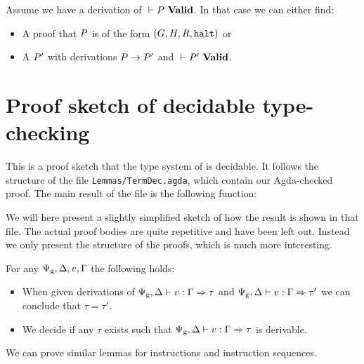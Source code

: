 \begin{theorem}
  Assume we have a derivation of ${} |- {P}\ \mathbf{Valid}$. In that case we can either
  find:
  \begin{itemize}
  \item A proof that $P$ is of the form
    $(G, H, R, \mathtt{halt})$ or
  \item A $P'$ with derivations ${P} -> {P'}$ and ${} |- {P'}\ \mathbf{Valid}$.
  \end{itemize}
\end{theorem}

\chapter{Proof sketch of decidable type-checking}
\label{sec:decproof}

This is a proof sketch that the type system of \ATAL is decidable. It follows
the structure of the file \texttt{Lemmas/TermDec.agda}, which contain our
Agda-checked proof. The main result of the file is the following function:

\begin{code}
\> \AgdaSymbol{:}     \AgdaSymbol{(}  \AgdaSymbol{)}\<%
\end{code}

We will here present a slightly simplified sketch of how the result is shown in
that file. The actual proof bodies are quite repetitive and have been left
out. Instead we only present the structure of the proofs, which is much more
interesting.

\begin{lemma}
  \label{lemma:dec-v}
  For any $\Psi_{\mathrm{g}},\Delta, v,\Gamma$ the following holds:

  \begin{itemize}
  \item When given derivations of
    ${\Psi_{\mathrm{g}},\Delta} |- {v} : {\Gamma => \tau}$ and
    ${\Psi_{\mathrm{g}},\Delta} |- {v} : {\Gamma => \tau'}$ we can
    conclude that $\tau = \tau'$.
  \item We decide if any $\tau$ exists such that
    ${\Psi_{\mathrm{g}},\Delta} |- {v} : {\Gamma => \tau}$ is derivable.
  \end{itemize}

  We can prove similar lemmas for instructions and instruction sequences.
\end{lemma}


